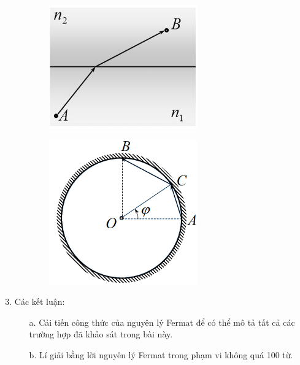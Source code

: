 \begin{figure}[h]
  \centering
  \begin{subfigure}[b]{0.49\textwidth}
    \centering
    \includegraphics[width=0.7\textwidth]{Figures/P3/Fig 3.8.png}
  \end{subfigure}
  \hfill
  \begin{subfigure}[b]{0.49\textwidth}
    \centering
    \includegraphics[width=0.7\textwidth]{Figures/P3/Fig 3.9.png}
  \end{subfigure}
\end{figure}

\begin{enumerate}
  \setcounter{enumi}{2}
  \item Các kết luận:
        \begin{enumerate}
          \item[a.] Cải tiến công thức của nguyên lý Fermat để có thể mô tả tất cả các trường hợp đã khảo sát trong bài này.
          \item[b.] Lí giải bằng lời nguyên lý Fermat trong phạm vi không quá 100 từ.
        \end{enumerate}
\end{enumerate}